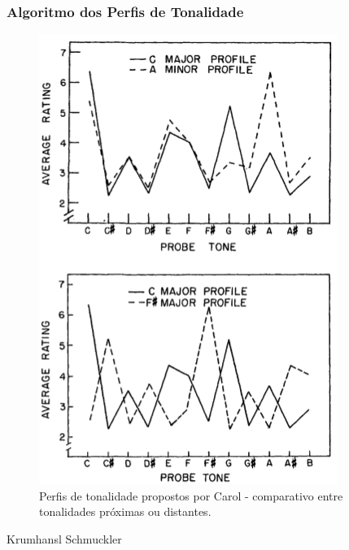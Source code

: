 \documentclass[
	12pt,				%
	openright,			%
	twoside,			%
	a4paper,			%
	english,			%
	french,				%
	spanish,			%
	brazil				%
	]{abntex2}
\begin{document}
\pagebreak
\subsubsection{Algoritmo dos Perfis de Tonalidade}

\lipsum[30]

\begin{figure}[!h]
	\caption{\label{fig_grafico}Perfis de tonalidade propostos por Carol  - comparativo entre tonalidades próximas ou distantes. }
	\begin{center}
	    \includegraphics[scale=0.6]{CBMS/probeones_krumhansl_p36.png}
	\end{center}
\end{figure}



 
Krumhansl Schmuckler 
\end{document}
